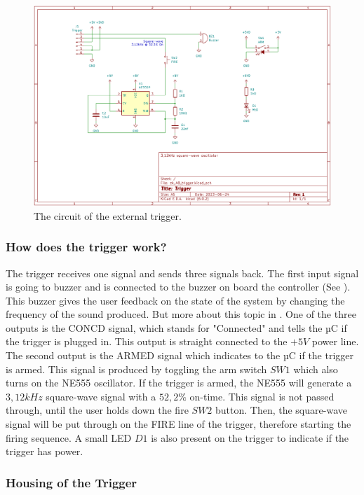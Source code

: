 \begin{figure}[!ht]
    \centering
    \includegraphics[width=15cm]{./Figures/trigger_circuit.png}
    \caption{The circuit of the external trigger.}
    \label{fig:trigger_circuit}     
\end{figure}

\pagebreak

\subsubsection{How does the trigger work?}
The trigger receives one signal and sends three signals back. The first input signal is going to buzzer and is connected to the buzzer on board the controller (See ). This buzzer gives the user feedback on the state of the system by changing the frequency of the sound produced. But more about this topic in . One of the three outputs is the CONCD signal, which stands for "Connected" and tells the µC if the trigger is plugged in. This output is straight connected to the $+5V$ power line. The second output is the ARMED signal which indicates to the µC if the trigger is armed. This signal is produced by toggling the arm switch $SW1$ which also turns on the NE555 oscillator. If the trigger is armed, the NE555 will generate a $3,12kHz$ square-wave signal with a $52,2\%$ on-time. This signal is not passed through, until the user holds down the fire $SW2$ button. Then, the square-wave signal will be put through on the FIRE line of the trigger, therefore starting the firing sequence. A small LED $D1$ is also present on the trigger to indicate if the trigger has power.


\subsubsection{Housing of the Trigger}


